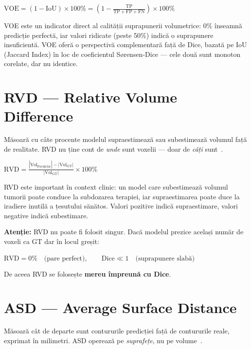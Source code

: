 \documentclass[12pt, a4paper]{report}
\newcommand{\formula}[1]{%
    \begin{center}
        \colorbox{codebackground}{%
            \parbox{0.88\textwidth}{\centering\vspace{4pt}$#1$\vspace{4pt}}%
        }
    \end{center}
}
\begin{document}
\formula{
    \text{VOE} = (1 - \text{IoU}) \times 100\%
    = \left(1 - \frac{\text{TP}}{\text{TP} + \text{FP} + \text{FN}}\right) \times 100\%
}

VOE este un indicator direct al calității suprapunerii volumetrice: 0\% înseamnă predicție perfectă,
iar valori ridicate (peste 50\%) indică o suprapunere insuficientă.
VOE oferă o perspectivă complementară față de Dice, bazată pe IoU (Jaccard Index) în loc de
coeficientul Sørensen-Dice — cele două sunt monoton corelate, dar nu identice.

\section{RVD — Relative Volume Difference}

\vspace{4pt}
\begin{infobox}
Măsoară cu câte procente modelul supraestimează sau subestimează
volumul față de realitate. RVD nu ține cont de \textit{unde} sunt
voxelii — doar de \textit{câți} sunt~\cite{bilic2023lits}.
\end{infobox}

\formula{
    \text{RVD} = \frac{|\text{Vol}_{\text{Predicție}}| - |\text{Vol}_{\text{GT}}|}{|\text{Vol}_{\text{GT}}|} \times 100\%
}

RVD este important în context clinic: un model care subestimează volumul tumorii poate conduce
la subdozarea terapiei, iar supraestimarea poate duce la iradiere inutilă a țesutului sănătos.
Valori pozitive indică supraestimare, valori negative indică subestimare.

\begin{badbox}
\textbf{Atenție:} RVD nu poate fi folosit singur.
Dacă modelul prezice același număr de voxeli ca GT dar în locul greșit:
\formula{
    \text{RVD} = 0\% \quad \text{(pare perfect)}, \qquad
    \text{Dice} \ll 1 \quad \text{(suprapunere slabă)}
}
De aceea RVD se folosește \textbf{mereu împreună cu Dice}.
\end{badbox}

\section{ASD — Average Surface Distance}

\vspace{4pt}
\begin{infobox}
Măsoară cât de departe sunt contururile predicției față de contururile
reale, exprimat în milimetri. ASD operează pe \textit{suprafețe},
nu pe volume~\cite{bilic2023lits}.
\end{infobox}
\end{document}
